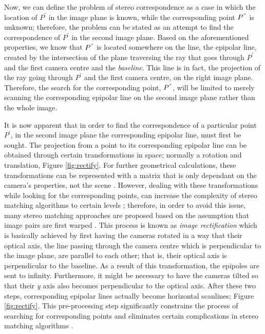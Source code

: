Now, we can define the problem of stereo correspondence as a case in which the location of $P^{'}$ in the image plane is known, while the
corresponding point $P^{"}$ is unknown; therefore, the problem can be stated as an attempt to find the correspondence of $P^{'}$ in the second image plane. Based on the aforementioned 
properties, we know that $P^{"}$ is located somewhere on the line, the epipolar line,
created by the intersection of the plane traversing the ray that goes through $P^{'}$ and the first camera centre and the {\it baseline}. This line is in fact, the projection of the ray going
through $P^{'}$ and the first camera centre, on the right image plane. Therefore, the search for the corresponding point, $P^{"}$, will be limited to merely scanning the corresponding 
epipolar line on the second image plane rather than the whole image.


It is now apparent that in order to find the correspondence of a particular point $P^{'}$, in the second image plane
the corresponding epipolar line, must first be sought. 
The projection from a point to its corresponding epipolar line can be obtained through certain transformations in space; normally a rotation and translation, Figure \ref{fig:rectify}.
For further geometrical calculations, these transformations can be represented
with a matrix that is only dependant on the camera's properties, not the scene \cite{hart2000}.
However, dealing with these transformations while looking for the corresponding points, can increase the complexity of stereo matching algorithms to certain levels \cite{sze11}; therefore, 
in order to avoid this issue, many stereo matching approaches are proposed based on the assumption that image pairs are first warped \cite{sze11}.
This process is known as {\it image rectification} which is basically achieved by first having the cameras rotated in a way that their optical axis, 
the line passing through the camera centre which is perpendicular to the image plane, are parallel to each other; 
that is, their optical axis is perpendicular to the baseline. As a result of this transformation, the epipoles are sent to infinity. 
Furthermore, it might be necessary to have the cameras tilted so that their {\it y} axis also becomes perpendicular to the optical axis. 
After these two steps, corresponding epipolar lines actually become horizontal scanlines; Figure \ref{fig:rectify}. This pre-processing step significantly constrains the process of searching 
for corresponding points and eliminates certain complications in stereo matching algorithms \cite{sze11}.

